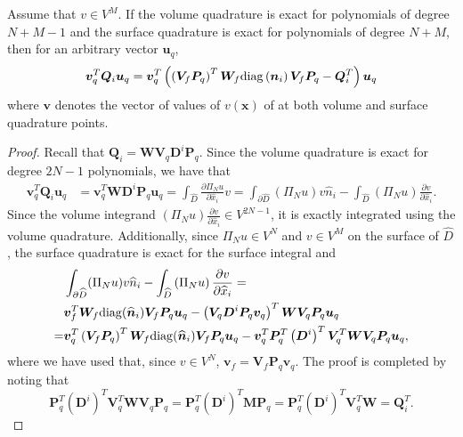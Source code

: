 \documentclass[review]{siamart0216}
\theoremstyle{assumption}
\renewcommand{\hat}[1]{\hat{#1}}
\newcommand{\pd}[2]{\frac{\partial#1}{\partial#2}}
\newcommand{\LRp}[1]{\left( #1 \right)}
\newcommand{\LRl}[1]{\left. #1 \right|}
\renewcommand{\hat}{\widehat}
\newcommand{\diag}[1]{{\rm diag}\LRp{#1}}
\begin{document}
\begin{lemma}
Assume that $v \in V^M$.  %
If the volume quadrature is exact for polynomials of degree $N+M-1$ and the surface quadrature is exact for polynomials of degree $N+M$, then for an arbitrary vector $\bm{u}_q$, 
\[
\bm{v}_q^T\bm{Q}_i \bm{u}_q = \bm{v}_q^T\LRp{ \LRp{\bm{V}_f\bm{P}_q}^T \bm{W}_f \diag{{\bm{n}}_i}\bm{V}_f\bm{P}_q - \bm{Q}_i^T}\bm{u}_q
\]
where $\bm{v}$ denotes the vector of values of $v(\bm{x})$ of at both volume and surface quadrature points. 
\label{lemma:vsbp}
\end{lemma}
\begin{proof}
Recall that $\bm{Q}_i = \bm{W} \bm{V}_q \bm{D}^i\bm{P}_q$.  Since the volume quadrature is exact for degree $2N-1$ polynomials, we have that
\begin{align*}
\bm{v}_q^T\bm{Q}_i \bm{u}_q &= \bm{v}_q^T\bm{W} \bm{D}^i \bm{P}_q \bm{u}_q = \int_{\hat{D}} \pd{\Pi_N u}{\hat{x}_i} v = \int_{\partial \hat{D}} (\Pi_N u) v \hat{n}_i - \int_{\hat{D}} \LRp{\Pi_N u} \pd{v}{\hat{x}_i}.
\end{align*}
Since the volume integrand $\LRp{\Pi_N u} \pd{v}{\hat{x}_i} \in V^{2N-1}$, it is exactly integrated using the volume quadrature.  Additionally, since $\Pi_N u \in V^N$ and $v\in V^M$ on the surface of $\hat{D}$, the surface quadrature is exact for the surface integral and 
\begin{align*}
&\int_{\partial \hat{D}} (\Pi_N u) v \hat{n}_i -   \int_{\hat{D}} \LRp{\Pi_N u} \pd{v}{\hat{x}_i} =\\
 &\bm{v}_f^T\bm{W}_f{\rm diag}(\hat{\bm{n}}_i) \bm{V}_f\bm{P}_q\bm{u}_q - \LRp{\bm{V}_q\bm{D}^i\bm{P}_q\bm{v}_q}^T\bm{W} \bm{V}_q\bm{P}_q\bm{u}_q\\
=& \bm{v}_q^T \LRp{\bm{V}_f\bm{P}_q}^T\bm{W}_f{\rm diag}(\hat{\bm{n}}_i) \bm{V}_f\bm{P}_q\bm{u}_q - \bm{v}_q^T \bm{P}_q^T\LRp{\bm{D}^i}^T \bm{V}_q^T \bm{W} \bm{V}_q\bm{P}_q\bm{u}_q,
\end{align*}
where we have used that, since $v\in V^N$, $\bm{v}_f = \bm{V}_f\bm{P}_q\bm{v}_q$.  The proof is completed by noting that 
\[
\bm{P}_q^T\LRp{\bm{D}^i}^T \bm{V}_q^T \bm{W} \bm{V}_q\bm{P}_q = \bm{P}_q^T\LRp{\bm{D}^i}^T \bm{M}\bm{P}_q = \bm{P}_q^T\LRp{\bm{D}^i}^T \bm{V}_q^T\bm{W} = \bm{Q}_i^T.
\]
\end{proof}
\end{document}
